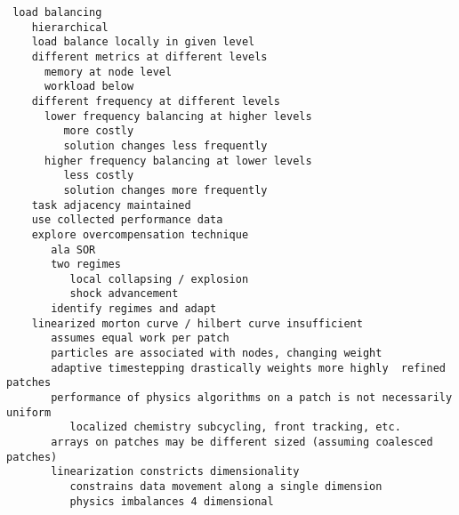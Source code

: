 \documentclass[14pt,letter]{article}
\begin{document}
\begin{verbatim}
 load balancing
    hierarchical
    load balance locally in given level
    different metrics at different levels
      memory at node level
      workload below
    different frequency at different levels
      lower frequency balancing at higher levels
         more costly
         solution changes less frequently
      higher frequency balancing at lower levels
         less costly
         solution changes more frequently
    task adjacency maintained
    use collected performance data
    explore overcompensation technique
       ala SOR
       two regimes
          local collapsing / explosion
          shock advancement
       identify regimes and adapt
    linearized morton curve / hilbert curve insufficient
       assumes equal work per patch
       particles are associated with nodes, changing weight
       adaptive timestepping drastically weights more highly  refined patches
       performance of physics algorithms on a patch is not necessarily uniform
          localized chemistry subcycling, front tracking, etc.
       arrays on patches may be different sized (assuming coalesced patches)
       linearization constricts dimensionality
          constrains data movement along a single dimension
          physics imbalances 4 dimensional
\end{verbatim}
\end{document}
